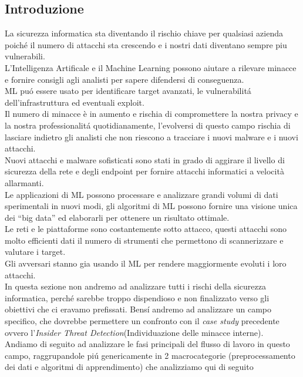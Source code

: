 \documentclass[../tesi.tex]{subfiles}
\begin{document}
\subsection{Introduzione}
La sicurezza informatica sta diventando il rischio chiave per qualsiasi azienda poiché il numero di attacchi sta crescendo e i nostri dati diventano sempre piu vulnerabili.\\
L’Intelligenza Artificale e il Machine Learning possono aiutare a rilevare minacce e fornire consigli agli analisti per sapere difendersi di conseguenza.\\
ML puó essere usato per identificare target avanzati, le vulnerabilitá dell’infrastruttura ed eventuali exploit.\\
Il numero di minacce è in aumento e rischia di compromettere la nostra privacy e la nostra professionalitá quotidianamente, l’evolversi di questo campo rischia di lasciare indietro gli analisti che non riescono a tracciare i nuovi malware e i nuovi attacchi.\\
Nuovi attacchi e malware sofisticati sono stati in grado di aggirare il livello di sicurezza della rete e degli endpoint per fornire attacchi informatici a velocità allarmanti.\\
Le applicazioni di ML possono processare e analizzare grandi volumi di dati sperimentali in nuovi modi, gli algoritmi di ML possono fornire una visione unica dei “big data” ed elaborarli per ottenere un risultato ottimale.\\
Le reti e le piattaforme sono costantemente sotto attacco, questi attacchi sono molto efficienti dati il numero di strumenti che permettono di scannerizzare e valutare i target.\\
Gli avversari stanno gia usando il ML per rendere maggiormente evoluti i loro attacchi.
\cite{fraley2017promise,bresniker2019grand,MLSecurity}\\
In questa sezione non andremo ad analizzare tutti i rischi della sicurezza informatica, perché sarebbe troppo dispendioso e non finalizzato verso gli obiettivi che ci eravamo prefissati.
Bensí andremo ad analizzare un campo specifico, che dovrebbe permettere un confronto con il \textit{case study} precedente ovvero l'\textit{Insider Threat Detection}(Individuazione delle minacce interne).\\
Andiamo di seguito ad analizzare le fasi principali del flusso di lavoro in questo campo, raggrupandole piú genericamente in 2 macrocategorie (preprocessamento dei dati e algoritmi di apprendimento) che analizziamo qui di seguito
\end{document}
